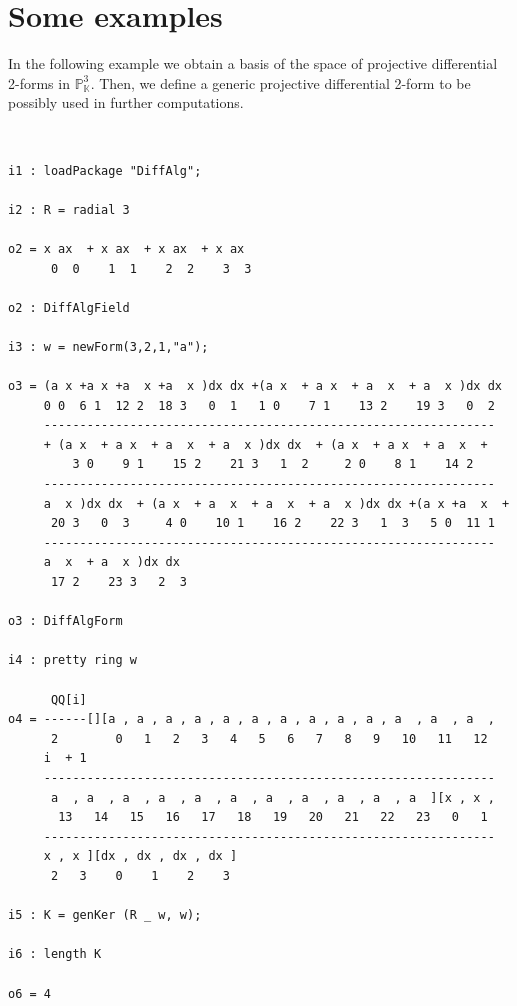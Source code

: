 \documentclass{amsart}
\theoremstyle{definition}
\def\KK{\mathbb{K}}
\def\PP{\mathbb{P}}
\begin{document}
\section{Some examples}

\ex\label{ex1} In the following example we obtain a basis of the space of projective differential 2-forms in $\PP_\KK^3$. Then, we define a generic projective differential 2-form to be possibly used in further computations.

\bigskip

{\tt\footnotesize
\begin{lstlisting}
i1 : loadPackage "DiffAlg";

i2 : R = radial 3

o2 = x ax  + x ax  + x ax  + x ax
      0  0    1  1    2  2    3  3

o2 : DiffAlgField

i3 : w = newForm(3,2,1,"a");   

o3 = (a x +a x +a  x +a  x )dx dx +(a x  + a x  + a  x  + a  x )dx dx 
     0 0  6 1  12 2  18 3   0  1   1 0    7 1    13 2    19 3   0  2
     ---------------------------------------------------------------
     + (a x  + a x  + a  x  + a  x )dx dx  + (a x  + a x  + a  x  +
         3 0    9 1    15 2    21 3   1  2     2 0    8 1    14 2  
     ---------------------------------------------------------------
     a  x )dx dx  + (a x  + a  x  + a  x  + a  x )dx dx +(a x +a  x  +
      20 3   0  3     4 0    10 1    16 2    22 3   1  3   5 0  11 1  
     ---------------------------------------------------------------
     a  x  + a  x )dx dx
      17 2    23 3   2  3

o3 : DiffAlgForm

i4 : pretty ring w

      QQ[i]
o4 = ------[][a , a , a , a , a , a , a , a , a , a , a  , a  , a  ,
      2        0   1   2   3   4   5   6   7   8   9   10   11   12 
     i  + 1
     ---------------------------------------------------------------
      a  , a  , a  , a  , a  , a  , a  , a  , a  , a  , a  ][x , x , 
       13   14   15   16   17   18   19   20   21   22   23   0   1 
     ---------------------------------------------------------------
     x , x ][dx , dx , dx , dx ]
      2   3    0    1    2    3
                                                                
i5 : K = genKer (R _ w, w);

i6 : length K

o6 = 4


\end{lstlisting}}
\end{document}
